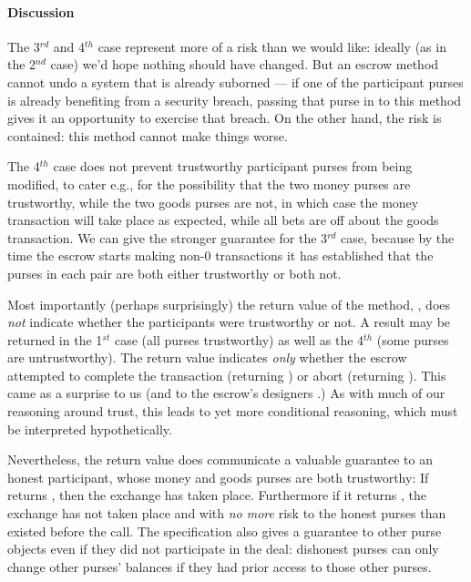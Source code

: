\paragraph{Discussion} The 3$^{rd}$  and 4$^{th}$ case represent  more
of a risk than we would like: ideally (as
  in the 2$^{nd}$ case) we'd hope nothing should have changed. But an
  escrow method cannot undo a system that is already suborned --- if
  one of the participant purses is already benefiting from a security
  breach, passing that purse in to this method gives it an opportunity
  to exercise that breach.  On the other hand, the risk is contained:
  this method cannot make things worse.
%

The
 4$^{th}$ case does not prevent trustworthy participant purses from
 being modified, to cater e.g., for the possibility that the two money
 purses are  trustworthy, while the two goods purses are not, in which
 case  the money transaction will take place as expected,  while all
 bets are off about the goods transaction.
 We can give the stronger guarantee for the 3$^{rd}$ case, because by
 the time the escrow starts making non-$0$ transactions  it has established that the purses in each
 pair are both either trustworthy or both not.

Most importantly (perhaps surprisingly)
the return value of the method, , does {\em not} indicate
whether the participants were trustworthy or not. A 
result may be returned in the 1$^{st}$ case (all purses trustworthy)
as well as the 4$^{th}$ (some purses are untrustworthy).  The
return value indicates {\em only} whether the escrow attempted to complete the
transaction (returning ) or abort (returning
). This came
 as a surprise to us (and to the escrow's designers \cite{miller-esop2013}.)
As with much of our reasoning around trust,
this leads to yet more conditional reasoning, which must be
interpreted hypothetically.

Nevertheless, the return value does communicate a valuable guarantee to an honest
participant,   whose money and goods purses are both
trustworthy:  If  returns , then the exchange has taken
place. Furthermore if it returns , the exchange has not taken
place and with \textit{no more} risk to the honest purses than existed before the call.
%
%
%
%
%
The  specification also gives a guarantee to other
purse objects even if they did not participate in the deal:
dishonest purses can only change
other purses' balances if they had prior access to those other purses.

